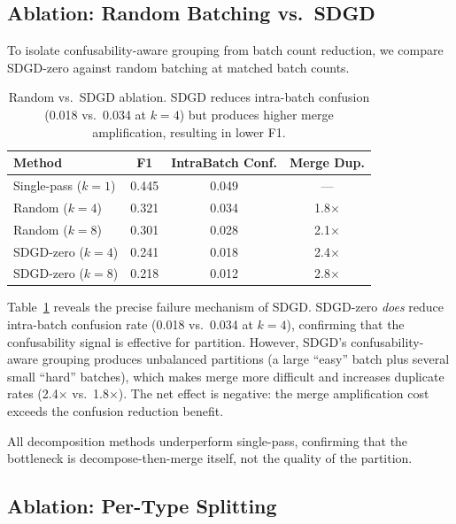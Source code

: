 \documentclass[11pt,a4paper]{article}
\begin{document}
\subsection{Ablation: Random Batching vs.\ SDGD}
\label{sec:ablation-random}

To isolate confusability-aware grouping from batch count reduction, we compare SDGD-zero against random batching at matched batch counts.

\begin{table}[t]
\centering
\small
\begin{tabular}{lccc}
\toprule
\textbf{Method} & \textbf{F1} & \textbf{IntraBatch Conf.} & \textbf{Merge Dup.} \\
\midrule
Single-pass ($k{=}1$) & 0.445 & 0.049 & --- \\
Random ($k{=}4$)      & 0.321 & 0.034 & 1.8$\times$ \\
Random ($k{=}8$)      & 0.301 & 0.028 & 2.1$\times$ \\
SDGD-zero ($k{=}4$)   & 0.241 & 0.018 & 2.4$\times$ \\
SDGD-zero ($k{=}8$)   & 0.218 & 0.012 & 2.8$\times$ \\
\bottomrule
\end{tabular}
\caption{Random vs.\ SDGD ablation. SDGD reduces intra-batch confusion (0.018 vs.\ 0.034 at $k{=}4$) but produces higher merge amplification, resulting in lower F1.}
\label{tab:ablation-random}
\end{table}

Table~\ref{tab:ablation-random} reveals the precise failure mechanism of SDGD.
SDGD-zero \emph{does} reduce intra-batch confusion rate (0.018 vs.\ 0.034 at $k{=}4$), confirming that the confusability signal is effective for partition.
However, SDGD's confusability-aware grouping produces unbalanced partitions (a large ``easy'' batch plus several small ``hard'' batches), which makes merge more difficult and increases duplicate rates (2.4$\times$ vs.\ 1.8$\times$).
The net effect is negative: the merge amplification cost exceeds the confusion reduction benefit.

All decomposition methods underperform single-pass, confirming that the bottleneck is decompose-then-merge itself, not the quality of the partition.

\subsection{Ablation: Per-Type Splitting}
\label{sec:per-type}
\end{document}
